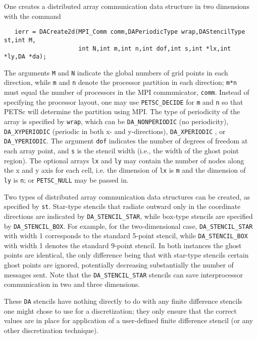 One creates a distributed array communication data structure 
in two dimensions with the command 
\begin{verbatim}
   ierr = DACreate2d(MPI_Comm comm,DAPeriodicType wrap,DAStencilType st,int M,
                     int N,int m,int n,int dof,int s,int *lx,int *ly,DA *da);
\end{verbatim}
The   arguments
 {\tt M} and {\tt N} indicate the global
numbers of grid points in each direction, while {\tt m} and {\tt n}
denote the processor partition in each direction; {\tt m*n} must equal
the number of processors in the MPI communicator, {\tt comm}.  
Instead of specifying the processor layout, one may use
{\tt PETSC\_DECIDE} for {\tt m} and {\tt n} 
so that PETSc will determine the partition using MPI. The type of
periodicity of the array is specified by {\tt wrap}, which can be 
{\tt DA\_NONPERIODIC}  (no periodicity), 
{\tt DA\_XYPERIODIC}  (periodic in
both x- and y-directions), {\tt DA\_XPERIODIC} , 
or {\tt DA\_YPERIODIC}.  The argument {\tt dof} 
indicates the number of degrees of freedom at each array point,
and {\tt s} is the stencil width (i.e., the width of the ghost point region).
The optional arrays {\tt lx} and {\tt ly} may contain the number of nodes
along the x and y axis for each cell, i.e. the dimension of {\tt lx} is
{\tt m} and the dimension of {\tt ly} is {\tt n}; or {\tt PETSC\_NULL} 
may be passed in.

Two types of distributed array communication data structures 
can be created, as specified by {\tt st}.
Star-type stencils that radiate outward only in the coordinate
directions are indicated by {\tt DA\_STENCIL\_STAR},
 while box-type stencils are specified by
{\tt DA\_STENCIL\_BOX}.  For example, for the
two-dimensional case,
{\tt DA\_STENCIL\_STAR} with width 1 corresponds to the standard 5-point
stencil, while {\tt DA\_STENCIL\_BOX} with width 1 denotes the
standard 9-point stencil.  In both instances the ghost points are
identical, the only difference being that with star-type stencils
certain ghost points are ignored, potentially decreasing substantially
the number of messages sent.  Note that the {\tt DA\_STENCIL\_STAR}
stencils can save interprocessor communication in two and three
dimensions.

These {\tt DA} stencils have nothing directly to do with any finite
difference stencils one might chose to use for a discretization; they
only ensure that the correct values are in place for application of a
user-defined finite difference stencil (or any other
discretization technique).

